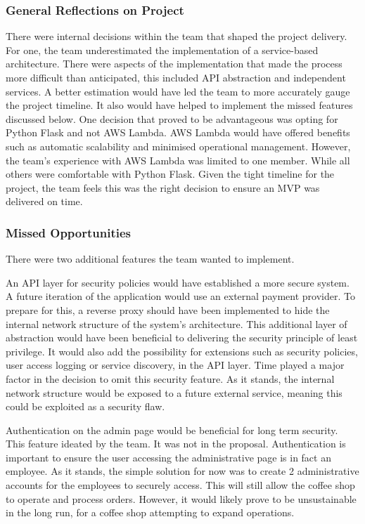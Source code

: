 \documentclass{article}
\begin{document}
\subsubsection*{General Reflections on Project}

There were internal decisions within the team that shaped the project delivery. For one, the team underestimated the implementation of a service-based architecture. There were aspects of the implementation that made the process more difficult than anticipated, this included API abstraction and independent services. A better estimation would have led the team to more accurately gauge the project timeline. It also would have helped to implement the missed features discussed below. One decision that proved to be advantageous was opting for Python Flask and not AWS Lambda. AWS Lambda would have offered benefits such as automatic scalability and minimised operational management. However, the team's experience with AWS Lambda was limited to one member. While all others were comfortable with Python Flask. Given the tight timeline for the project, the team feels this was the right decision to ensure an MVP was delivered on time. 

\subsubsection*{Missed Opportunities}
There were two additional features the team wanted to implement.

\medskip \noindent An API layer for security policies would have established a more secure system. A future iteration of the application would use an external payment provider. To prepare for this, a reverse proxy should have been implemented to hide the internal network structure of the system's architecture. This additional layer of abstraction would have been beneficial to delivering the security principle of least privilege. It would also add the possibility for extensions such as security policies, user access logging or service discovery, in the API layer. Time played a major factor in the decision to omit this security feature. As it stands, the internal network structure would be exposed to a future external service, meaning this could be exploited as a security flaw. 

\medskip \noindent Authentication on the admin page would be beneficial for long term security. This feature ideated by the team. It was not in the proposal. Authentication is important to ensure the user accessing the administrative page is in fact an employee. As it stands, the simple solution for now was to create 2 administrative accounts for the employees to securely access. This will still allow the coffee shop to operate and process orders. However, it would likely prove to be unsustainable in the long run, for a coffee shop attempting to expand operations.
\end{document}
